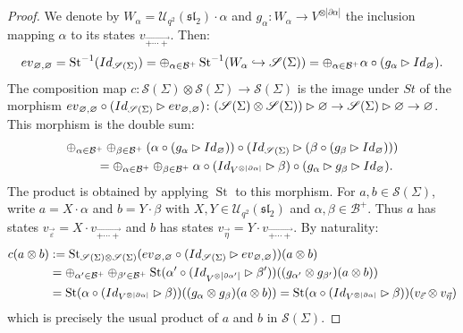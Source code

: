 \documentclass[11pt]{article}
\numberwithin{equation}{section}
\numberwithin{equation}{section}
\newcommand{\abss}[1]{\left\vert #1 \right\vert}
\newcommand{\St}{\operatorname{St}}
\newcommand{\Uq}{\mathcal{U}_{q^2}(\mathfrak{sl}_2)}
\begin{document}
\begin{proof}
 We denote by $W_\alpha = \Uq\cdot \alpha$ and $g_\alpha\colon W_\alpha \to V^{\otimes \abss{\partial \alpha}}$ the inclusion mapping $\alpha$ to its states $v_{\overrightarrow{+\cdots +}}$. Then:
 \[
 {\rm ev}_{\varnothing,\varnothing} =\St^{-1}({\rm Id}_{\mathscr{S}(\Sigma)}) = \oplus_{\alpha \in \mathcal{B}^+} \St^{-1}(W_\alpha \hookrightarrow \mathscr{S}(\Sigma)) = \oplus_{\alpha \in \mathcal{B}^+}\alpha \circ (g_\alpha \rhd {\rm Id}_\varnothing).
 \]
The composition map $c \colon \mathscr{S}(\Sigma) \otimes \mathscr{S}(\Sigma) \to \mathscr{S}(\Sigma)$ is the image under $St$ of the morphism ${\rm ev}_{\varnothing,\varnothing} \circ ({\rm Id}_{\mathscr{S}(\Sigma)} \rhd {\rm ev}_{\varnothing,\varnothing}) \colon (\mathscr{S}(\Sigma) \otimes \mathscr{S}(\Sigma))\rhd \varnothing \to \mathscr{S}(\Sigma) \rhd \varnothing\to\varnothing$. This morphism is the double sum:
\begin{gather*}
\oplus_{\alpha \in \mathcal{B}^+}\oplus_{\beta \in \mathcal{B}^+}(\alpha \circ (g_\alpha \rhd {\rm Id}_\varnothing))\circ ({\rm Id}_{\mathscr{S}(\Sigma)} \rhd (\beta \circ (g_\beta \rhd {\rm Id}_\varnothing)))
\\ \qquad
{}=\oplus_{\alpha \in \mathcal{B}^+}\oplus_{\beta \in \mathcal{B}^+}\alpha \circ ({\rm Id}_{V^{\otimes \abss{\partial \alpha}}}\rhd \beta) \circ (g_\alpha \rhd g_\beta \rhd {\rm Id}_\varnothing) .
\end{gather*}
The product is obtained by applying $\St$ to this morphism. For $a,b \in \mathscr{S}(\Sigma)$, write $a=X\cdot \alpha$ and $b=Y\cdot \beta$ with $X,Y \in \Uq$ and $\alpha,\beta \in \mathcal{B}^+$. Thus $a$ has states $v_{\vec{\varepsilon}} = X \cdot v_{\overrightarrow{+\cdots +}}$ and $b$ has states $v_{\vec{\eta}}=Y \cdot v_{\overrightarrow{+\cdots +}}$. By naturality:
\begin{align*}
c(a\otimes b) &:= \St_{\mathscr{S}(\Sigma)\otimes \mathscr{S}(\Sigma)}({\rm ev}_{\varnothing,\varnothing} \circ ({\rm Id}_{\mathscr{S}(\Sigma)} \rhd {\rm ev}_{\varnothing,\varnothing}))(a\otimes b)
\\
&= \oplus_{\alpha' \in \mathcal{B}^+}\oplus_{\beta' \in \mathcal{B}^+} \St(\alpha' \circ ({\rm Id}_{V^{\otimes \abss{\partial \alpha'}}}\rhd \beta'))((g_{\alpha'} \otimes g_{\beta'})(a \otimes b))
\\
& = \St(\alpha \circ ({\rm Id}_{V^{\otimes \abss{\partial \alpha}}}\rhd \beta))((g_\alpha \otimes g_\beta)(a \otimes b)) = \St(\alpha \circ ({\rm Id}_{V^{\otimes \abss{\partial \alpha}}}\rhd \beta))(v_{\vec{\varepsilon}} \otimes v_{\vec{\eta}})
\end{align*}
which is precisely the usual product of $a$ and $b$ in $\mathscr{S}(\Sigma)$.
\end{proof}
\end{document}
